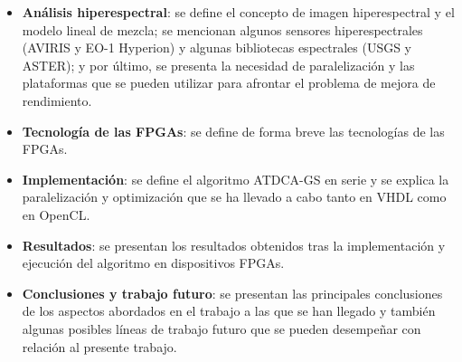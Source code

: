 \begin{itemize}
    \item \textbf{Análisis hiperespectral}: se define el concepto de imagen hiperespectral y el modelo lineal de mezcla; se mencionan algunos sensores hiperespectrales (AVIRIS y EO-1 Hyperion) y algunas bibliotecas espectrales (USGS y ASTER); y por último, se presenta la necesidad de paralelización y las plataformas que se pueden utilizar para afrontar el problema de mejora de rendimiento.
    \item \textbf{Tecnología de las FPGAs}: se define de forma breve las tecnologías de las FPGAs.
    \item \textbf{Implementación}: se define el algoritmo ATDCA-GS en serie y se explica la paralelización y optimización que se ha llevado a cabo tanto en VHDL como en OpenCL.
    \item \textbf{Resultados}: se presentan los resultados obtenidos tras la implementación y ejecución del algoritmo en dispositivos FPGAs.
    \item \textbf{Conclusiones y trabajo futuro}: se presentan las principales conclusiones de los aspectos abordados en el trabajo a las que se han llegado y también algunas posibles líneas de trabajo futuro que se pueden desempeñar con relación al presente trabajo.
\end{itemize}




